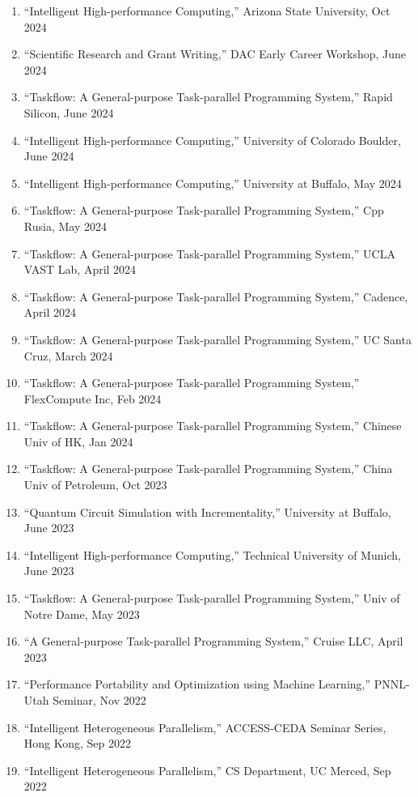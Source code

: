 \documentclass[A4,11pt]{article}
\begin{document}
 \begin{enumerate}
 \itemsep-0.3em
  \item ``Intelligent High-performance Computing,'' Arizona State University, Oct 2024
  \item ``Scientific Research and Grant Writing,'' DAC Early Career Workshop, June 2024
  \item ``Taskflow: A General-purpose Task-parallel Programming System,'' Rapid Silicon, June 2024
  \item ``Intelligent High-performance Computing,'' University of Colorado Boulder, June 2024
  \item ``Intelligent High-performance Computing,'' University at Buffalo, May 2024
  \item ``Taskflow: A General-purpose Task-parallel Programming System,'' Cpp Rusia, May 2024
  \item ``Taskflow: A General-purpose Task-parallel Programming System,'' UCLA VAST Lab, April 2024
  \item ``Taskflow: A General-purpose Task-parallel Programming System,'' Cadence, April 2024
  \item ``Taskflow: A General-purpose Task-parallel Programming System,'' UC Santa Cruz, March 2024 
  \item ``Taskflow: A General-purpose Task-parallel Programming System,'' FlexCompute Inc, Feb 2024
  \item ``Taskflow: A General-purpose Task-parallel Programming System,'' Chinese Univ of HK, Jan 2024
  \item ``Taskflow: A General-purpose Task-parallel Programming System,'' China Univ of Petroleum, Oct 2023
  \item ``Quantum Circuit Simulation with Incrementality,'' University at Buffalo, June 2023
  \item ``Intelligent High-performance Computing,'' Technical University of Munich, June 2023
  \item ``Taskflow: A General-purpose Task-parallel Programming System,'' Univ of Notre Dame, May 2023
  \item ``A General-purpose Task-parallel Programming System,'' Cruise LLC, April 2023
  \item ``Performance Portability and Optimization using Machine Learning,'' PNNL-Utah Seminar, Nov 2022
  \item ``Intelligent Heterogeneous Parallelism,'' ACCESS-CEDA Seminar Series, Hong Kong, Sep 2022
  \item ``Intelligent Heterogeneous Parallelism,'' CS Department, UC Merced, Sep 2022

\end{enumerate}
\end{document}
